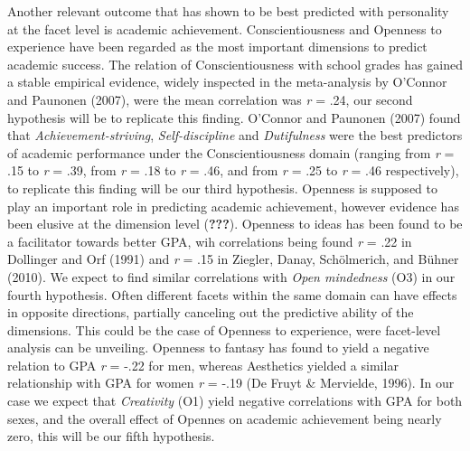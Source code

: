 \documentclass[,man,floatsintext]{apa6}
\begin{document}
Another relevant outcome that has shown to be best predicted with
personality at the facet level is academic achievement.
Conscientiousness and Openness to experience have been regarded as the
most important dimensions to predict academic success. The relation of
Conscientiousness with school grades has gained a stable empirical
evidence, widely inspected in the meta-analysis by O'Connor and Paunonen
(2007), were the mean correlation was \emph{r} = .24, our second
hypothesis will be to replicate this finding. O'Connor and Paunonen
(2007) found that \emph{Achievement-striving}, \emph{Self-discipline}
and \emph{Dutifulness} were the best predictors of academic performance
under the Conscientiousness domain (ranging from \emph{r} = .15 to
\emph{r} = .39, from \emph{r} = .18 to \emph{r} = .46, and from \emph{r}
= .25 to \emph{r} = .46 respectively), to replicate this finding will be
our third hypothesis. Openness is supposed to play an important role in
predicting academic achievement, however evidence has been elusive at
the dimension level ({\textbf{???}}). Openness to ideas has been found
to be a facilitator towards better GPA, wih correlations being found
\emph{r} = .22 in Dollinger and Orf (1991) and \emph{r} = .15 in
Ziegler, Danay, Schölmerich, and Bühner (2010). We expect to find
similar correlations with \emph{Open mindedness} (O3) in our fourth
hypothesis. Often different facets within the same domain can have
effects in opposite directions, partially canceling out the predictive
ability of the dimensions. This could be the case of Openness to
experience, were facet-level analysis can be unveiling. Openness to
fantasy has found to yield a negative relation to GPA \emph{r} = -.22
for men, whereas Aesthetics yielded a similar relationship with GPA for
women \emph{r} = -.19 (De Fruyt \& Mervielde, 1996). In our case we
expect that \emph{Creativity} (O1) yield negative correlations with GPA
for both sexes, and the overall effect of Opennes on academic
achievement being nearly zero, this will be our fifth hypothesis.
\end{document}
